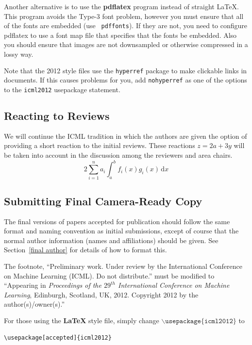 \documentclass{article}
\begin{document}
Another alternative is to use the \textbf{pdflatex} program instead of
straight \LaTeX. This program avoids the Type-3 font problem, however
you must ensure that all of the fonts are embedded (use {\tt
pdffonts}). If they are not, you need to configure pdflatex to use a
font map file that specifies that the fonts be embedded. Also you
should ensure that images are not downsampled or otherwise compressed
in a lossy way.

Note that the 2012 style files use the {\tt hyperref} package to
make clickable links in documents.  If this causes problems for you,
add {\tt nohyperref} as one of the options to the {\tt icml2012}
usepackage statement.

\subsection{Reacting to Reviews}
We will continue the ICML tradition in which the authors are given the
option of providing a short reaction to the initial reviews. These
reactions $z=2a+3y$ will be taken into account in the discussion among the
reviewers and area chairs.
\begin{equation}2\sum_{i=1}^n a_i \int^b_a f_i(x)g_i(x)\,\mathrm{d}x\end{equation}

\subsection{Submitting Final Camera-Ready Copy}

The final versions of papers accepted for publication should follow the
same format and naming convention as initial submissions, except of
course that the normal author information (names and affiliations)
should be given.  See Section~\ref{final author} for details of how to
format this.

The footnote, ``Preliminary work.  Under review by the International
Conference on Machine Learning (ICML).  Do not distribute.'' must be
modified to ``Appearing in \textit{Proceedings of the
$\mathit{29}^{th}$ International Conference on Machine Learning},
Edinburgh, Scotland, UK, 2012.  Copyright 2012 by the author(s)/owner(s).''

For those using the \textbf{\LaTeX} style file, simply change
$\mathtt{\backslash usepackage\{icml2012\}}$ to

\verb|\usepackage[accepted]{icml2012}|
\end{document}

